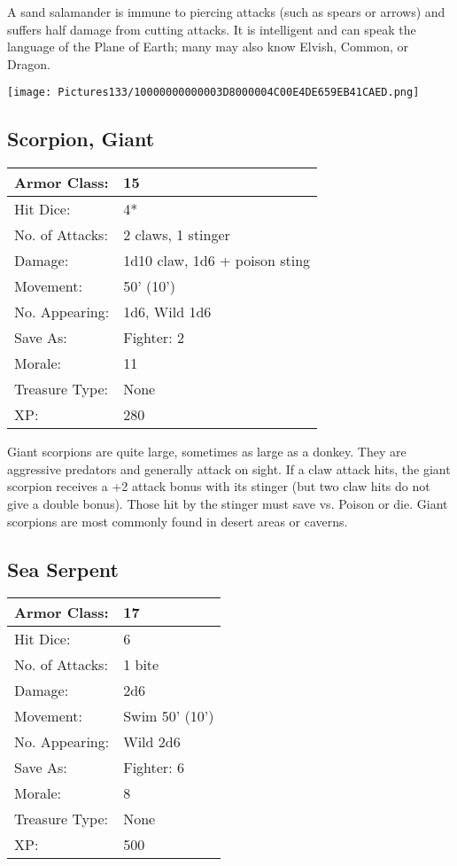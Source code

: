 \documentclass[a4paper,twoside,openany,10pt]{book}
\begin{document}
\begin{multicols}{2}
A sand salamander is immune to piercing attacks (such as spears or arrows) and suffers half damage from cutting attacks. It is intelligent and can speak the language of the Plane of Earth; many may also know Elvish, Common, or Dragon.

\begin{center} \texttt{[image: Pictures133/10000000000003D8000004C00E4DE659EB41CAED.png]} \end{center}


\subsection*{Scorpion, Giant}\label{scorpion-giant}

\begin{tabularx}{0.50\textwidth}{@{}lX@{}}
Armor Class: & 15 \\\hline
Hit Dice: & 4* \\\hline
No. of Attacks: & 2 claws, 1 stinger \\\hline
Damage: & 1d10 claw, 1d6 + poison sting \\\hline
Movement: & 50' (10') \\\hline
No. Appearing: & 1d6, Wild 1d6 \\\hline
Save As: & Fighter: 2 \\\hline
Morale: & 11 \\\hline
Treasure Type: & None \\\hline
XP: & 280 \\\hline
\end{tabularx}\medskip

Giant scorpions are quite large, sometimes as large as a donkey. They are aggressive predators and generally attack on sight. If a claw attack hits, the giant scorpion receives a +2 attack bonus with its stinger (but two claw hits do not give a double bonus). Those hit by the stinger must save vs. Poison or die. Giant scorpions are most commonly found in desert areas or caverns.

\subsection*{Sea Serpent}\label{sea-serpent}

\begin{tabularx}{0.50\textwidth}{@{}lX@{}}
Armor Class: & 17 \\\hline
Hit Dice: & 6 \\\hline
No. of Attacks: & 1 bite \\\hline
Damage: & 2d6 \\\hline
Movement: & Swim 50' (10') \\\hline
No. Appearing: & Wild 2d6 \\\hline
Save As: & Fighter: 6 \\\hline
Morale: & 8 \\\hline
Treasure Type: & None \\\hline
XP: & 500 \\\hline
\end{tabularx}\medskip


\end{multicols}
\end{document}
